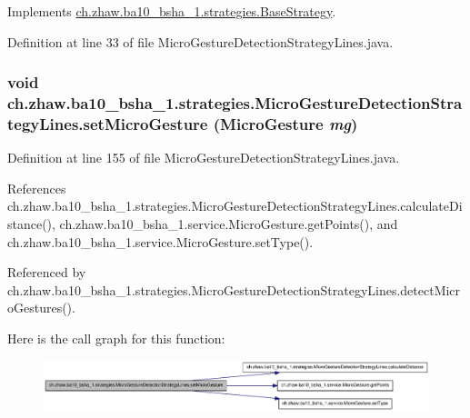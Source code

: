Implements \hyperlink{classch_1_1zhaw_1_1ba10__bsha__1_1_1strategies_1_1BaseStrategy_a0496e8fd0099a5f0f7765322d7e752a9}{ch.zhaw.ba10\_\-bsha\_\-1.strategies.BaseStrategy}.

Definition at line 33 of file MicroGestureDetectionStrategyLines.java.\hypertarget{classch_1_1zhaw_1_1ba10__bsha__1_1_1strategies_1_1MicroGestureDetectionStrategyLines_ae2fe4b45825de8b32bd93848a6ecac12}{
\subsubsection[{setMicroGesture}]{\setlength{\rightskip}{0pt plus 5cm}void ch.zhaw.ba10\_\-bsha\_\-1.strategies.MicroGestureDetectionStrategyLines.setMicroGesture ({\bf MicroGesture} {\em mg})}}
\label{classch_1_1zhaw_1_1ba10__bsha__1_1_1strategies_1_1MicroGestureDetectionStrategyLines_ae2fe4b45825de8b32bd93848a6ecac12}


Definition at line 155 of file MicroGestureDetectionStrategyLines.java.

References ch.zhaw.ba10\_\-bsha\_\-1.strategies.MicroGestureDetectionStrategyLines.calculateDistance(), ch.zhaw.ba10\_\-bsha\_\-1.service.MicroGesture.getPoints(), and ch.zhaw.ba10\_\-bsha\_\-1.service.MicroGesture.setType().

Referenced by ch.zhaw.ba10\_\-bsha\_\-1.strategies.MicroGestureDetectionStrategyLines.detectMicroGestures().

Here is the call graph for this function:\nopagebreak
\begin{figure}[H]
\begin{center}
\leavevmode
\includegraphics[width=420pt]{classch_1_1zhaw_1_1ba10__bsha__1_1_1strategies_1_1MicroGestureDetectionStrategyLines_ae2fe4b45825de8b32bd93848a6ecac12_cgraph}
\end{center}
\end{figure}


